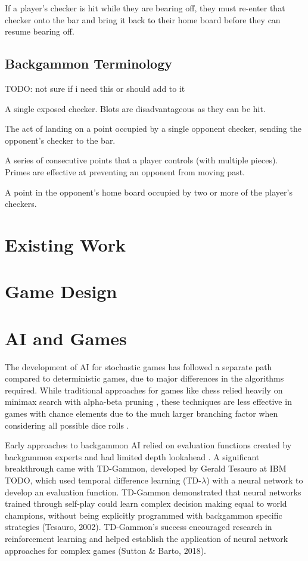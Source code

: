 If a player's checker is hit while they are bearing off, they must re-enter that checker onto the bar and bring it back to their home board before they can resume bearing off.
\label{sec:rules}

\subsection{Backgammon Terminology}
TODO: not sure if i need this or should add to it
\begin{definition}[Blot]
A single exposed checker. Blots are disadvantageous as they can be hit.
\end{definition}

\begin{definition}[Hitting]
    The act of landing on a point occupied by a single opponent checker, sending the opponent's checker to the bar.
\end{definition}

\begin{definition}[Primes]
    A series of consecutive points that a player controls (with multiple pieces). Primes are effective at preventing an opponent from moving past.
\end{definition}

\begin{definition}[Anchors]
    A point in the opponent's home board occupied by two or more of the player's checkers.    
\end{definition}

\section{Existing Work}
\section{Game Design}
\section{AI and Games}

The development of AI for stochastic games has followed a separate path compared to deterministic games, due to major differences in the algorithms required. 
While traditional approaches for games like chess relied heavily on minimax search with alpha-beta pruning \cite{deepblue}, these techniques are less effective in games with chance elements due to the much larger branching factor when considering all possible dice rolls \cite{RussellNorvig}.

Early approaches to backgammon AI relied on evaluation functions created by backgammon experts and had limited depth lookahead \cite{berliner1980}. A significant breakthrough came with TD-Gammon, developed by Gerald Tesauro at IBM TODO, which used temporal difference learning (TD-$\lambda$) with a neural network to develop an evaluation function. TD-Gammon demonstrated that neural networks trained through self-play could learn complex decision making equal to world champions, without being explicitly programmed with backgammon specific strategies (Tesauro, 2002). TD-Gammon's success encouraged research in reinforcement learning and helped establish the application of neural network approaches for complex games (Sutton \& Barto, 2018).
